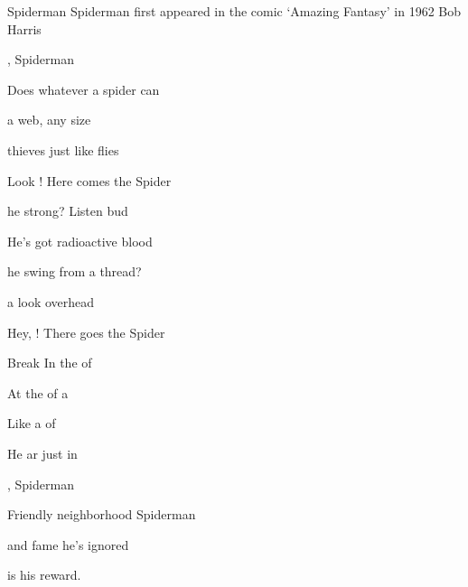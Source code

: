\begin{SBSong}{Spiderman}
  {Spiderman first appeared in the comic `Amazing Fantasy' in 1962}
  {Bob Harris}
  \begin{SBVerse}
    , Spiderman
    
    Does whatever a spider can
    
     a web, any size
    
     thieves just like flies
    
    Look ! Here comes the Spider
  \end{SBVerse}
  \begin{SBVerse}
     he strong? Listen bud
    
    He's got radioactive blood
    
     he swing from a thread?
    
     a look overhead
    
    Hey, ! There goes the Spider 
  \end{SBVerse}
  \begin{SBBracket}{Break}
    In the  of 
    
    At the  of a 
    
    Like a  of 
    
    He ar just in  
  \end{SBBracket}
  \begin{SBVerse}
    , Spiderman
    
    Friendly neighborhood Spiderman
    
     and fame he's ignored
    
     is his reward.
  \end{SBVerse}
\end{SBSong}
